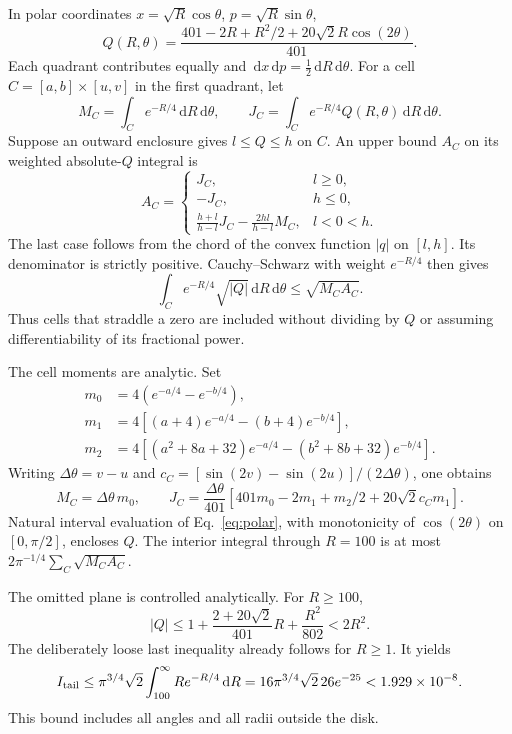 \documentclass[11pt]{article}
\newcommand{\dd}{\,\mathrm{d}}
\begin{document}
In polar coordinates $x=\sqrt R\cos\theta$, $p=\sqrt R\sin\theta$,
\begin{equation}
 Q(R,\theta)=\frac{401-2R+R^2/2+
                       20\sqrt{2}R\cos(2\theta)}{401}.
 \label{eq:polar}
\end{equation}
Each quadrant contributes equally and $\dd x\dd p=\frac12\dd R\dd\theta$.
For a cell $C=[a,b]\times[u,v]$ in the first quadrant, let
\begin{equation}
 M_C=\int_C e^{-R/4}\dd R\dd\theta,\qquad
 J_C=\int_C e^{-R/4}Q(R,\theta)\dd R\dd\theta.
\end{equation}
Suppose an outward enclosure gives $l\leq Q\leq h$ on $C$.
An upper bound $A_C$ on its weighted absolute-$Q$ integral is
\begin{equation}
 A_C=
 \begin{cases}
 J_C,&l\geq0,\\
 -J_C,&h\leq0,\\
 \displaystyle\frac{h+l}{h-l}J_C-\frac{2hl}{h-l}M_C,
       &l<0<h.
 \end{cases}
 \label{eq:chord}
\end{equation}
The last case follows from the chord of the convex function $|q|$ on
$[l,h]$. Its denominator is strictly positive.
Cauchy--Schwarz with weight $e^{-R/4}$ then gives
\begin{equation}
 \int_C e^{-R/4}\sqrt{|Q|}\dd R\dd\theta\leq\sqrt{M_CA_C}.
 \label{eq:cell}
\end{equation}
Thus cells that straddle a zero are included without dividing by $Q$ or
assuming differentiability of its fractional power.

The cell moments are analytic. Set
\begin{align}
 m_0&=4(e^{-a/4}-e^{-b/4}),\\
 m_1&=4[(a+4)e^{-a/4}-(b+4)e^{-b/4}],\\
 m_2&=4[(a^2+8a+32)e^{-a/4}-(b^2+8b+32)e^{-b/4}].
\end{align}
Writing $\Delta\theta=v-u$ and
$c_C=[\sin(2v)-\sin(2u)]/(2\Delta\theta)$, one obtains
\begin{equation}
 M_C=\Delta\theta\,m_0,\qquad
 J_C=\frac{\Delta\theta}{401}
 [401m_0-2m_1+m_2/2+20\sqrt{2}c_Cm_1].
\end{equation}
Natural interval evaluation of Eq.~\eqref{eq:polar}, with monotonicity of
$\cos(2\theta)$ on $[0,\pi/2]$, encloses $Q$.
The interior integral through $R=100$ is at most
$2\pi^{-1/4}\sum_C\sqrt{M_CA_C}$.

The omitted plane is controlled analytically. For $R\geq100$,
\begin{equation}
 |Q|\leq1+\frac{2+20\sqrt{2}}{401}R+\frac{R^2}{802}
       <2R^2.
\end{equation}
The deliberately loose last inequality already follows for $R\geq1$.
It yields
\begin{equation}
 I_{\rm tail}\leq
 \pi^{3/4}\sqrt{2}\int_{100}^{\infty}R e^{-R/4}\dd R
 =16\pi^{3/4}\sqrt{2}\,26e^{-25}
 <1.929\times10^{-8}.
 \label{eq:tail}
\end{equation}
This bound includes all angles and all radii outside the disk.
\end{document}
